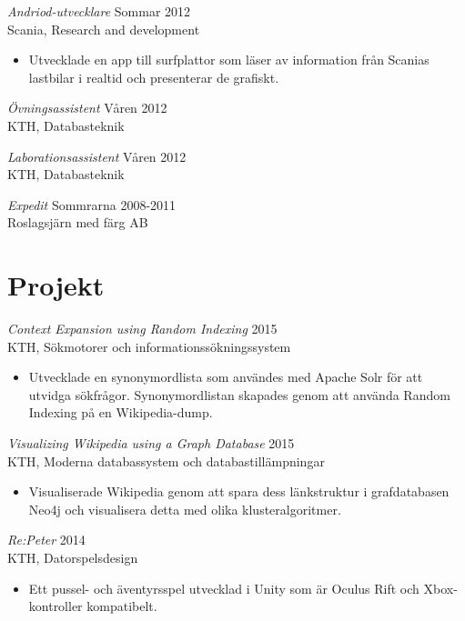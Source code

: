 \documentclass[margin, 10pt]{res} %
\begin{document}
\begin{resume}
{\sl Andriod-utvecklare} \hfill Sommar 2012 \\
Scania, Research and development
\begin{itemize} 
\item Utvecklade en app till surfplattor som läser av information från Scanias lastbilar i realtid och presenterar de grafiskt.
\end{itemize} 

{\sl Övningsassistent} \hfill Våren 2012 \\
KTH, Databasteknik

{\sl Laborationsassistent} \hfill Våren 2012 \\
KTH, Databasteknik

{\sl Expedit} \hfill Sommrarna 2008-2011 \\
Roslagsjärn med färg AB


\section{Projekt}

{\sl Context Expansion using Random Indexing} \hfill 2015 \\
KTH, Sökmotorer och informationssökningssystem
\begin{itemize} 
\item Utvecklade en synonymordlista som användes med Apache Solr för att utvidga sökfrågor. Synonymordlistan skapades genom att använda Random Indexing på en Wikipedia-dump.
\end{itemize} 

{\sl Visualizing Wikipedia using a Graph Database} \hfill 2015 \\
KTH, Moderna databassystem och databastillämpningar
\begin{itemize} 
\item Visualiserade Wikipedia genom att spara dess länkstruktur i grafdatabasen Neo4j och visualisera detta med olika klusteralgoritmer.
\end{itemize} 

{\sl Re:Peter} \hfill 2014 \\
KTH, Datorspelsdesign
\begin{itemize} 
\item Ett pussel- och äventyrsspel utvecklad i Unity som är Oculus Rift och Xbox-kontroller kompatibelt.
\end{itemize} 


\end{resume}
\end{document}
